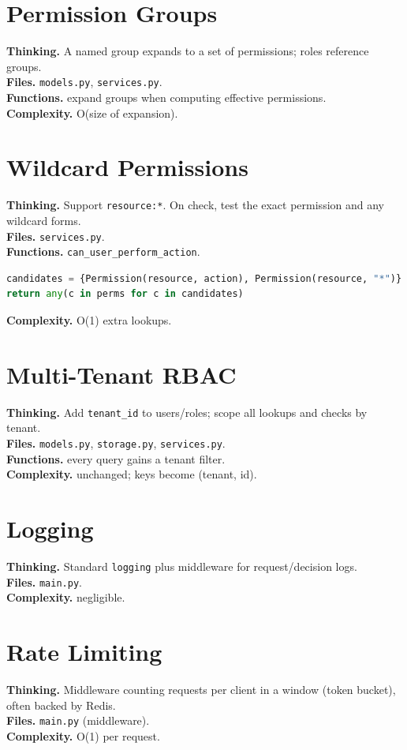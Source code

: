 \documentclass[11pt,a4paper]{report}
\begin{document}
\section{Permission Groups}
\textbf{Thinking.} A named group expands to a set of permissions; roles reference
groups.\\
\textbf{Files.} \texttt{models.py}, \texttt{services.py}.\\
\textbf{Functions.} expand groups when computing effective permissions.\\
\textbf{Complexity.} O(size of expansion).

\section{Wildcard Permissions}
\textbf{Thinking.} Support \texttt{resource:*}. On check, test the exact
permission and any wildcard forms.\\
\textbf{Files.} \texttt{services.py}.\\
\textbf{Functions.} \texttt{can\_user\_perform\_action}.
\begin{lstlisting}[language=Python]
candidates = {Permission(resource, action), Permission(resource, "*")}
return any(c in perms for c in candidates)
\end{lstlisting}
\textbf{Complexity.} O(1) extra lookups.

\section{Multi-Tenant RBAC}
\textbf{Thinking.} Add \texttt{tenant\_id} to users/roles; scope all lookups and
checks by tenant.\\
\textbf{Files.} \texttt{models.py}, \texttt{storage.py}, \texttt{services.py}.\\
\textbf{Functions.} every query gains a tenant filter.\\
\textbf{Complexity.} unchanged; keys become (tenant, id).

\section{Logging}
\textbf{Thinking.} Standard \texttt{logging} plus middleware for request/decision
logs.\\
\textbf{Files.} \texttt{main.py}.\\
\textbf{Complexity.} negligible.

\section{Rate Limiting}
\textbf{Thinking.} Middleware counting requests per client in a window (token
bucket), often backed by Redis.\\
\textbf{Files.} \texttt{main.py} (middleware).\\
\textbf{Complexity.} O(1) per request.
\end{document}

